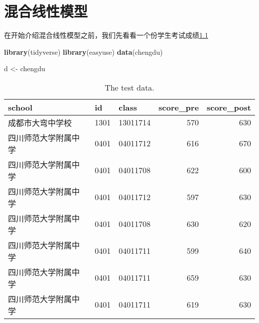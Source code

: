 \documentclass[
]{krantz}
\makeatletter
\newenvironment{Shaded}{\begin{snugshade}}{\end{snugshade}}
\newcommand{\DataTypeTok}[1]{\textcolor[rgb]{0.27,0.27,0.27}{#1}}
\newcommand{\DecValTok}[1]{\textcolor[rgb]{0.06,0.06,0.06}{#1}}
\newcommand{\KeywordTok}[1]{\textcolor[rgb]{0.27,0.27,0.27}{\textbf{#1}}}
\newcommand{\NormalTok}[1]{#1}
\newcommand{\OperatorTok}[1]{\textcolor[rgb]{0.43,0.43,0.43}{\textbf{#1}}}
\newcommand{\OtherTok}[1]{\textcolor[rgb]{0.37,0.37,0.37}{#1}}
\newcommand{\StringTok}[1]{\textcolor[rgb]{0.5,0.5,0.5}{#1}}
\newenvironment{kframe}{%
\medskip{}
\setlength{\fboxsep}{.8em}
 \def\at@end@of@kframe{}%
 \ifinner\ifhmode%
  \def\at@end@of@kframe{\end{minipage}}%
  \begin{minipage}{\columnwidth}%
 \fi\fi%
 \def\FrameCommand##1{\hskip\@totalleftmargin \hskip-\fboxsep
 \colorbox{shadecolor}{##1}\hskip-\fboxsep
     \hskip-\linewidth \hskip-\@totalleftmargin \hskip\columnwidth}%
 \MakeFramed {\advance\hsize-\width
   \@totalleftmargin\z@ \linewidth\hsize
   \@setminipage}}%
 {\par\unskip\endMakeFramed%
 \at@end@of@kframe}
\renewenvironment{Shaded}{\begin{kframe}}{\end{kframe}}
\makeatother
\begin{document}
\hypertarget{lmm}{%
\chapter{混合线性模型}\label{lmm}}

在开始介绍混合线性模型之前，我们先看看一个份学生考试成绩\ref{tab:test}

\begin{Shaded}
\begin{Highlighting}[]
\KeywordTok{library}\NormalTok{(tidyverse)}
\KeywordTok{library}\NormalTok{(easyuse)}
\KeywordTok{data}\NormalTok{(chengdu)}

\NormalTok{d <-}\StringTok{ }\NormalTok{chengdu}
\end{Highlighting}
\end{Shaded}

\begin{Shaded}
\end{Shaded}

\begin{table}

\caption{\label{tab:test}The test data.}
\centering
\begin{tabular}[t]{lllrr}
\toprule
school & id & class & score\_pre & score\_post\\
\midrule
成都市大弯中学校 & 1301 & 13011714 & 570 & 630\\
四川师范大学附属中学 & 0401 & 04011712 & 616 & 670\\
四川师范大学附属中学 & 0401 & 04011708 & 622 & 600\\
四川师范大学附属中学 & 0401 & 04011712 & 597 & 630\\
四川师范大学附属中学 & 0401 & 04011708 & 630 & 620\\
\addlinespace
四川师范大学附属中学 & 0401 & 04011711 & 599 & 640\\
四川师范大学附属中学 & 0401 & 04011711 & 659 & 630\\
四川师范大学附属中学 & 0401 & 04011711 & 619 & 630\\
\bottomrule
\end{tabular}
\end{table}
\end{document}
